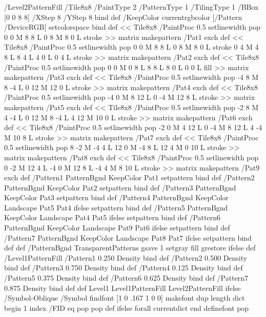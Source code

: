 /Level2PatternFill {
/Tile8x8 {/PaintType 2 /PatternType 1 /TilingType 1 /BBox [0 0 8 8] /XStep 8 /YStep 8}
	bind def
/KeepColor {currentrgbcolor [/Pattern /DeviceRGB] setcolorspace} bind def
<< Tile8x8
 /PaintProc {0.5 setlinewidth pop 0 0 M 8 8 L 0 8 M 8 0 L stroke} 
>> matrix makepattern
/Pat1 exch def
<< Tile8x8
 /PaintProc {0.5 setlinewidth pop 0 0 M 8 8 L 0 8 M 8 0 L stroke
	0 4 M 4 8 L 8 4 L 4 0 L 0 4 L stroke}
>> matrix makepattern
/Pat2 exch def
<< Tile8x8
 /PaintProc {0.5 setlinewidth pop 0 0 M 0 8 L
	8 8 L 8 0 L 0 0 L fill}
>> matrix makepattern
/Pat3 exch def
<< Tile8x8
 /PaintProc {0.5 setlinewidth pop -4 8 M 8 -4 L
	0 12 M 12 0 L stroke}
>> matrix makepattern
/Pat4 exch def
<< Tile8x8
 /PaintProc {0.5 setlinewidth pop -4 0 M 8 12 L
	0 -4 M 12 8 L stroke}
>> matrix makepattern
/Pat5 exch def
<< Tile8x8
 /PaintProc {0.5 setlinewidth pop -2 8 M 4 -4 L
	0 12 M 8 -4 L 4 12 M 10 0 L stroke}
>> matrix makepattern
/Pat6 exch def
<< Tile8x8
 /PaintProc {0.5 setlinewidth pop -2 0 M 4 12 L
	0 -4 M 8 12 L 4 -4 M 10 8 L stroke}
>> matrix makepattern
/Pat7 exch def
<< Tile8x8
 /PaintProc {0.5 setlinewidth pop 8 -2 M -4 4 L
	12 0 M -4 8 L 12 4 M 0 10 L stroke}
>> matrix makepattern
/Pat8 exch def
<< Tile8x8
 /PaintProc {0.5 setlinewidth pop 0 -2 M 12 4 L
	-4 0 M 12 8 L -4 4 M 8 10 L stroke}
>> matrix makepattern
/Pat9 exch def
/Pattern1 {PatternBgnd KeepColor Pat1 setpattern} bind def
/Pattern2 {PatternBgnd KeepColor Pat2 setpattern} bind def
/Pattern3 {PatternBgnd KeepColor Pat3 setpattern} bind def
/Pattern4 {PatternBgnd KeepColor Landscape {Pat5} {Pat4} ifelse setpattern} bind def
/Pattern5 {PatternBgnd KeepColor Landscape {Pat4} {Pat5} ifelse setpattern} bind def
/Pattern6 {PatternBgnd KeepColor Landscape {Pat9} {Pat6} ifelse setpattern} bind def
/Pattern7 {PatternBgnd KeepColor Landscape {Pat8} {Pat7} ifelse setpattern} bind def
} def
%
%
%
/PatternBgnd {
  TransparentPatterns {} {gsave 1 setgray fill grestore} ifelse
} def
%
%
/Level1PatternFill {
/Pattern1 {0.250 Density} bind def
/Pattern2 {0.500 Density} bind def
/Pattern3 {0.750 Density} bind def
/Pattern4 {0.125 Density} bind def
/Pattern5 {0.375 Density} bind def
/Pattern6 {0.625 Density} bind def
/Pattern7 {0.875 Density} bind def
} def
%
%
Level1 {Level1PatternFill} {Level2PatternFill} ifelse
%
/Symbol-Oblique /Symbol findfont [1 0 .167 1 0 0] makefont
dup length dict begin {1 index /FID eq {pop pop} {def} ifelse} forall
currentdict end definefont pop
